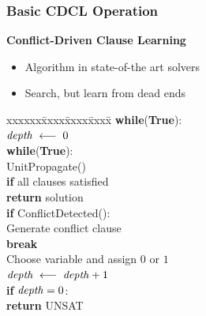 \documentclass[t,pdf]{beamer}
\newcommand{\keyword}[1]{\textbf{#1}}
\newcommand{\keyif}{\keyword{if}}
\newcommand{\keywhile}{\keyword{while}}
\newcommand{\keytrue}{\keyword{True}}
\newcommand{\keybreak}{\keyword{break}}
\newcommand{\keyreturn}{\keyword{return}}
\newcommand{\assign}{\ensuremath{\longleftarrow}}
\begin{document}
\begin{frame}
  \frametitle{Basic CDCL Operation}

  {\bf Conflict-Driven Clause Learning}
  \begin{itemize}
    \item Algorithm in state-of-the art solvers
    \item Search, but learn from dead ends
  \end{itemize}

\begin{tabbing}
xxxxxx\=xxxx\=xxxx\=xxxx\=\kill
\>\keywhile(\keytrue): \\
\>\>${\it depth}\; \assign \;0$ \\
\>\>\keywhile(\keytrue): \\
\>\>\>UnitPropagate() \\
\>\>\>\keyif{} all clauses satisfied \\
\>\>\>\>\keyreturn{} solution\\
\>\>\>\keyif{} ConflictDetected(): \\
\>\>\>\>Generate conflict clause \\
\>\>\>\>\keybreak{} \\
\>\>\>Choose variable and assign $0$ or $1$\\
\>\>\>${\it depth} \;\assign \; {\it depth} + 1$ \\
\>\>\keyif{} ${\it depth} = 0$: \\
\>\>\>\keyreturn{} UNSAT\\
\end{tabbing}


\end{frame}
\end{document}
